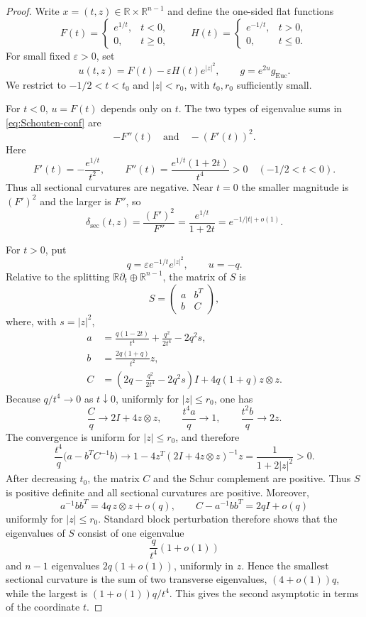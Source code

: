 \documentclass[10pt,a4paper]{amsart}
\newcommand{\R}{\mathbb R}
\newcommand{\abs}[1]{\lvert #1\rvert}
\newcommand{\dsec}{\delta_{\mathrm{sec}}}
\newcommand{\eps}{\varepsilon}
\begin{document}
\begin{proof}
Write $x=(t,z)\in\R\times\R^{n-1}$ and define the one-sided flat functions
\[
F(t)=\begin{cases}e^{1/t},&t<0,\\0,&t\ge0,\end{cases}
\qquad
H(t)=\begin{cases}e^{-1/t},&t>0,\\0,&t\le0.\end{cases}
\]
For small fixed $\eps>0$, set
\begin{equation}\label{eq:u-conformal}
u(t,z)=F(t)-\eps H(t)e^{\abs z^2},
\qquad
g=e^{2u}g_{\mathrm{Euc}}.
\end{equation}
We restrict to $-1/2<t<t_0$ and $\abs z<r_0$, with $t_0,r_0$ sufficiently small.

For $t<0$, $u=F(t)$ depends only on $t$.  The two types of eigenvalue sums in \eqref{eq:Schouten-conf} are
\[
-F''(t)
\quad\text{and}\quad
-(F'(t))^2.
\]
Here
\[
F'(t)=-\frac{e^{1/t}}{t^2},
\qquad
F''(t)=\frac{e^{1/t}(1+2t)}{t^4}>0
\quad(-1/2<t<0).
\]
Thus all sectional curvatures are negative.  Near $t=0$ the smaller magnitude is $(F')^2$ and the larger is $F''$, so
\[
\dsec(t,z)=\frac{(F')^2}{F''}
=\frac{e^{1/t}}{1+2t}
=e^{-1/\abs t+o(1)}.
\]

For $t>0$, put
\[
q=\eps e^{-1/t}e^{\abs z^2},
\qquad u=-q.
\]
Relative to the splitting $\R\partial_t\oplus\R^{n-1}$, the matrix of $S$ is
\[
S=\begin{pmatrix}a&b^T\\ b&C\end{pmatrix},
\]
where, with $s=\abs z^2$,
\begin{align*}
a&=\frac{q(1-2t)}{t^4}+\frac{q^2}{2t^4}-2q^2s,\\
b&=\frac{2q(1+q)}{t^2}z,\\
C&=\left(2q-\frac{q^2}{2t^4}-2q^2s\right)I
  +4q(1+q)z\otimes z.
\end{align*}
Because $q/t^4\to0$ as $t\downarrow0$, uniformly for $\abs z\le r_0$, one has
\[
\frac Cq\longrightarrow 2I+4z\otimes z,
\qquad
\frac{t^4a}{q}\longrightarrow1,
\qquad
\frac{t^2b}{q}\longrightarrow2z.
\]
The convergence is uniform for $\abs z\le r_0$, and therefore
\[
\frac{t^4}{q}\bigl(a-b^TC^{-1}b\bigr)
\longrightarrow
1-4z^T(2I+4z\otimes z)^{-1}z
=\frac1{1+2\abs z^2}>0.
\]
After decreasing $t_0$, the matrix $C$ and the Schur complement are positive.  Thus $S$ is positive definite and all sectional curvatures are positive.  Moreover,
\[
a^{-1}bb^T=4q\,z\otimes z+o(q),
\qquad
C-a^{-1}bb^T=2qI+o(q)
\]
uniformly for $\abs z\le r_0$.  Standard block perturbation therefore shows that the eigenvalues of $S$ consist of one eigenvalue
\[
\frac q{t^4}(1+o(1))
\]
and $n-1$ eigenvalues $2q(1+o(1))$, uniformly in $z$.  Hence the smallest sectional curvature is the sum of two transverse eigenvalues, $(4+o(1))q$, while the largest is $(1+o(1))q/t^4$.  This gives the second asymptotic in terms of the coordinate $t$.


\end{proof}
\end{document}
